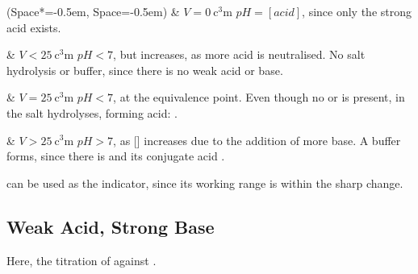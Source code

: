 			\begin{bulletlist}
				\ListProperties(Space*=-0.5em, Space=-0.5em)
				& $V = \SI{0}{\cubic\centi\metre}$
					\tabto{25mm}$pH = [acid]$, since only the strong acid exists.

				& $V < \SI{25}{\cubic\centi\metre}$
					\tabto{25mm}$pH < 7$, but increases, as more acid is neutralised.
					\tabto{25mm}No salt hydrolysis or buffer, since there is no weak acid or base.

				& $V = \SI{25}{\cubic\centi\metre}$
					\tabto{25mm}$pH < 7$, at the equivalence point.
					\tabto{25mm}Even though no  or  is present,  in the salt hydrolyses,
					\tabto{25mm}forming acid: .

				& $V > \SI{25}{\cubic\centi\metre}$
					\tabto{25mm}$pH > 7$, as [] increases due to the addition of more base.
					\tabto{25mm}A buffer forms, since there is  and its conjugate acid .

			\end{bulletlist}

			 can be used as the indicator, since its working range is within the sharp \pH{} change.




















		\pagebreak
		\subsection{Weak Acid, Strong Base}

			Here, the titration of  against .

